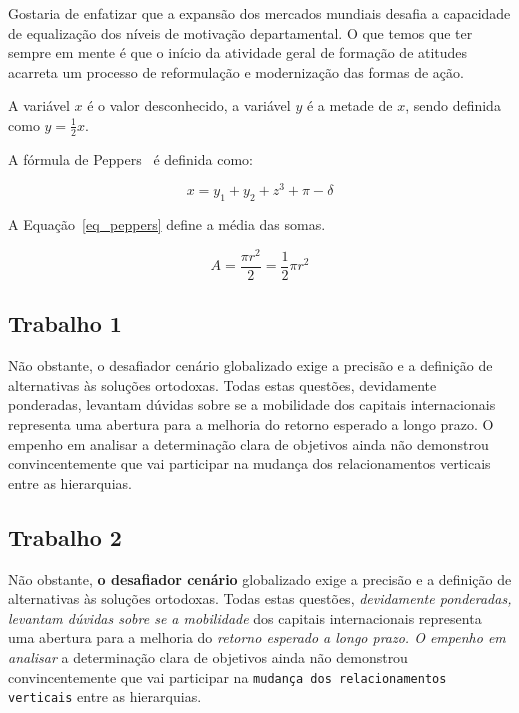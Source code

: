 \documentclass{article}
\begin{document}
          Gostaria de enfatizar que a expansão dos mercados mundiais desafia a capacidade de equalização dos níveis de motivação departamental. O que temos que ter sempre em mente é que o início da atividade geral de formação de atitudes acarreta um processo de reformulação e modernização das formas de ação. 
          
A variável $x$ é o valor desconhecido, a variável $y$ é a metade de $x$, sendo definida como $y=\frac{1}{2}x$.

A fórmula de Peppers~\cite{berg2006logica} é definida como:

$$
  x = y_1 + y_2 + z^3 + \pi - \delta
$$

A Equação~\ref{eq_peppers} define a média das somas.

\begin{equation}
\label{eq_peppers}
A = \frac{\pi r^2}{2} = \frac{1}{2} \pi r^2   
\end{equation} 
          
          
          
          
\subsection{Trabalho 1}          
          
Não obstante, o desafiador cenário globalizado exige a precisão e a definição de alternativas às soluções ortodoxas. Todas estas questões, devidamente ponderadas, levantam dúvidas sobre se a mobilidade dos capitais internacionais representa uma abertura para a melhoria do retorno esperado a longo prazo. O empenho em analisar a determinação clara de objetivos ainda não demonstrou convincentemente que vai participar na mudança dos relacionamentos verticais entre as hierarquias. 

\subsection{Trabalho 2}          
          
Não obstante, \textbf{o desafiador cenário} globalizado exige a precisão e a definição de alternativas às soluções ortodoxas. Todas estas questões, \textit{devidamente ponderadas, levantam dúvidas sobre se a mobilidade} dos capitais internacionais representa uma abertura para a melhoria do \emph{retorno esperado a longo prazo. O empenho em analisar} a determinação clara de objetivos ainda não demonstrou convincentemente que vai participar na \texttt{mudança dos relacionamentos verticais} entre as hierarquias. 
\end{document}
